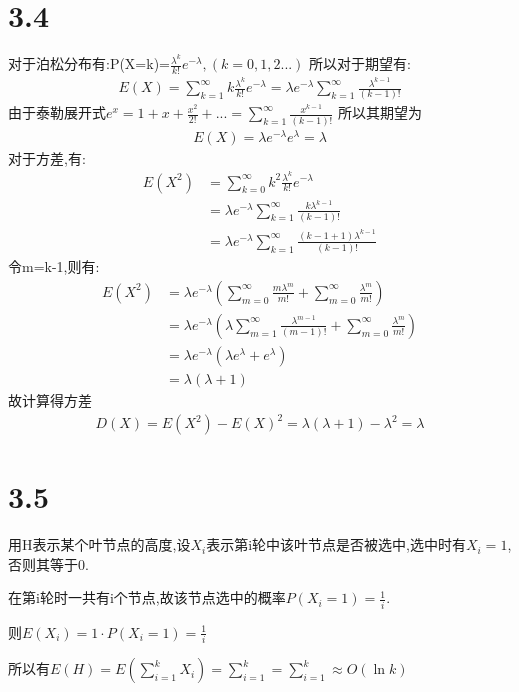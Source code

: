 \documentclass[12pt,a4paper,fontset=none]{ctexart}
\begin{document}
\section*{3.4}

对于泊松分布有:P(X=k)=$\frac{\lambda ^k}{k!}e^{-\lambda},(k=0,1,2...) $
所以对于期望有:
\begin{align*}
	E(X)=\sum_{k=1}^{\infty}k\frac{\lambda^k}{k!}e^{-\lambda}=\lambda e^{-\lambda}\sum_{k=1}^{\infty} \frac{\lambda ^{k-1}}{(k-1)!}
\end{align*}
由于泰勒展开式$e^x=1+x+\frac{x^2}{2!}+...=\sum_{k=1}^{\infty}\frac{x^{k-1}}{(k-1)!}  $
所以其期望为
\begin{align*}
	E(X)=\lambda e^{-\lambda}e^{\lambda}=\lambda
\end{align*}
对于方差,有:\begin{align*}
	E(X^2) & =\sum_{k=0}^{\infty}k^2\frac{\lambda ^k}{k!}e^{-\lambda}                       \\&=\lambda e^{-\lambda}\sum_{k=1}^{\infty} \frac{k\lambda ^{k-1}}{(k-1)!}\\
	       & = \lambda e^{-\lambda}\sum_{k=1}^{\infty} \frac{(k-1+1)\lambda ^{k-1}}{(k-1)!}
\end{align*}
令m=k-1,则有:\begin{align*}
	E(X^2) & =\lambda e^{-\lambda}(\sum_{m=0}^{\infty} \frac{m\lambda ^{m}}{m!}+\sum_{m=0}^{\infty}\frac{\lambda ^m}{m!} )             \\
	       & =\lambda e^{-\lambda}(\lambda \sum_{m=1}^{\infty}\frac{\lambda ^{m-1}}{(m-1)!}+\sum_{m=0}^{\infty}\frac{\lambda ^m}{m!} ) \\
	       & =\lambda e^{-\lambda}(\lambda e^{\lambda}+e^{\lambda})                                                                    \\ &=\lambda(\lambda+1)
\end{align*}
故计算得方差\begin{align*}
	D(X)=E(X^2)-E(X)^2=\lambda(\lambda+1)-\lambda^2=\lambda
\end{align*}
\section*{3.5}
用H表示某个叶节点的高度,设$X_i$表示第i轮中该叶节点是否被选中,选中时有$X_i=1$,否则其等于0.

在第i轮时一共有i个节点,故该节点选中的概率$P(X_i=1)=\frac{1}{i} $.

则$E(X_i)=1\cdot P(X_i=1)=\frac{1}{i} $

所以有$E(H)=E(\sum_{i=1}^{k}X_i)=\sum_{i=1}^{k}=\sum_{i=1}^{k}\approx O(\ln k)$
\end{document}
